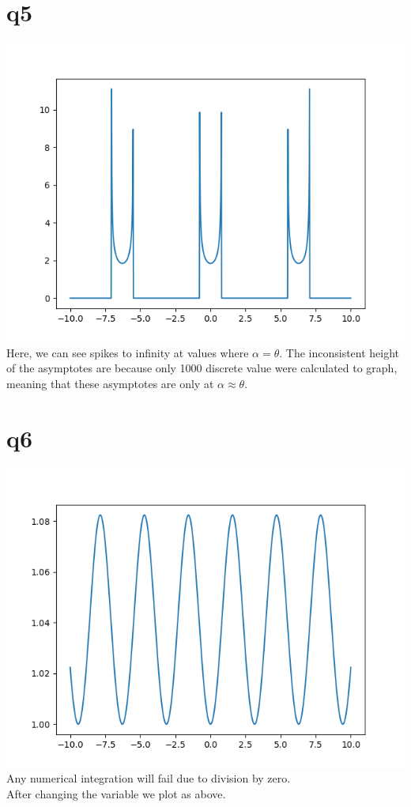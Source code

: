 \documentclass[a4paper,english]{article}
\begin{document}
    \section{q5}
    \includegraphics[scale=0.8]{./q4_5.png}
        Here, we can see spikes to infinity at values where $\alpha = \theta$. The inconsistent height
        of the asymptotes are because only 1000 discrete value were calculated to graph, meaning that
        these asymptotes are only at $\alpha \approx \theta$.
        \\
    \section{q6}
        \includegraphics[scale=0.8]{./q4_6.png}
        Any numerical integration will fail due to division by zero.
        \\
        After changing the variable we plot as above.
        \\
\end{document}

